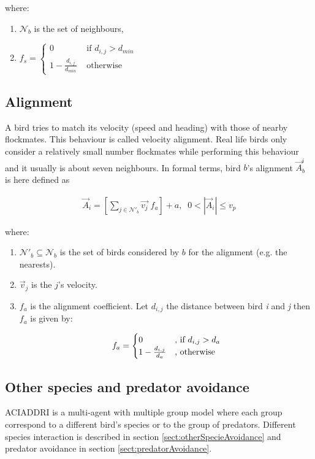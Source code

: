 where:

\begin{enumerate}
	\item \(\mathcal{N}_b\) is the set of neighbours, %
	\item $
	f_s = \begin{cases}
	0 &\mbox{ if }  d_{i,j} > d_{min}\\
	1 - \frac{d_{i,j}}{d_{min}} &\mbox{ otherwise}
	\end{cases}$
\end{enumerate}

\subsection{Alignment}
A bird tries to match its velocity (speed and heading) with those of
nearby flockmates. This behaviour is called velocity alignment. Real life birds only consider a relatively small number flockmates while performing this behaviour and it usually is about seven neighbours\cite{Hemelrijk:2011}.
In formal terms, bird $b$'s alignment \(\vec{A}_b^i\) is here defined as %

\begin{align}
\vec{A}_i = \left[\sum_{j \in \mathcal{N}'_b}{\vec{v_j}}\;f_a\right] + a, \;\;0 < |\vec{A}_i| \leq v_p
\label{eq:alignment}
\end{align}

where:

\begin{enumerate}
	\item \(\mathcal{N}'_b \subseteq \mathcal{N}_b\) is the set of birds considered by $b$ for the alignment (e.g. the nearests).
	\item \(\vec{v}_j\) is the $j$'s velocity.
	\item \(f_a\) is the alignment coefficient. Let \(d_{i,j}\) the distance between bird \emph{i} and \emph{j} then \(f_a\) is given by:
	
	\begin{equation*}
	f_a = \begin{cases}
	0 &\text{, if $ d_{i,j} > d_a$}\\
	1- \frac{d_{i,j}}{d_a} &\text{, otherwise}
	\end{cases}
	\end{equation*}
\end{enumerate}

\subsection{Other species and predator avoidance}
\textsc{ACIADDRI} is a multi-agent with multiple group model where each group correspond to a different bird's species or to the group of predators. 
Different species interaction is described in section \ref{sect:otherSpecieAvoidance} and predator avoidance in section \ref{sect:predatorAvoidance}.

